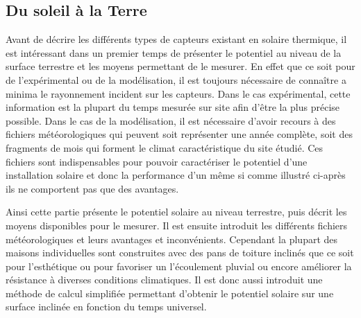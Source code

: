\subsection{Du soleil à la Terre} %
\label{sub:du_soleil_a_la_terre}
Avant de décrire les différents types de capteurs existant en solaire thermique,
il est intéressant dans un premier temps de présenter le potentiel au niveau de
la surface terrestre et les moyens permettant de le mesurer. En effet que ce soit
pour de l’expérimental ou de la modélisation, il est toujours nécessaire de connaître
a minima le rayonnement incident sur les capteurs. Dans le cas expérimental, cette
information est la plupart du temps mesurée sur site afin d’être la plus précise
possible. Dans le cas de la modélisation, il est nécessaire d’avoir recours à des
fichiers météorologiques qui peuvent soit représenter une année complète, soit des
fragments de mois qui forment le climat caractéristique du site étudié. Ces fichiers
sont indispensables pour pouvoir caractériser le potentiel d’une installation solaire
et donc la performance d’un  même si comme illustré ci-après ils ne comportent
pas que des avantages.

Ainsi cette partie présente le potentiel solaire au niveau terrestre, puis décrit les
moyens disponibles pour le mesurer. Il est ensuite introduit les différents fichiers
météorologiques et leurs avantages et inconvénients. Cependant la plupart des maisons
individuelles sont construites avec des pans de toiture inclinés que ce soit pour
l’esthétique ou pour favoriser un l’écoulement pluvial ou encore améliorer la résistance à
diverses conditions climatiques. Il est donc aussi introduit une méthode de calcul
simplifiée permettant d’obtenir le potentiel solaire sur une surface inclinée en fonction
du temps universel.


